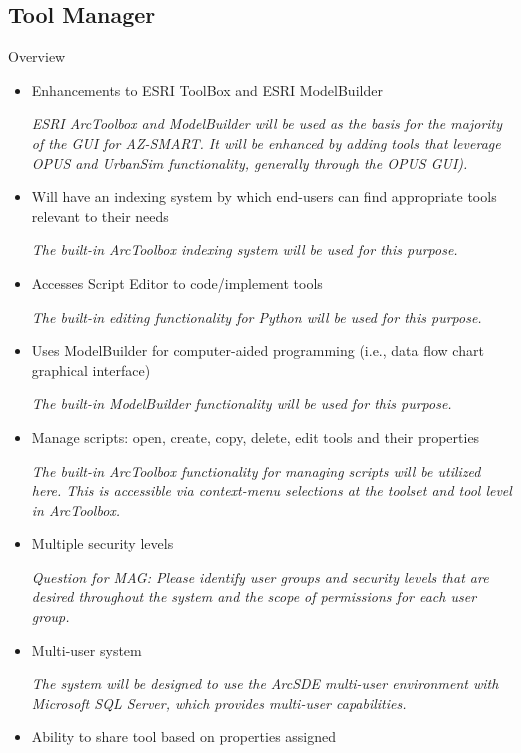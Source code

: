 \subsection{Tool Manager}
Overview
\begin{itemize}

\item Enhancements to ESRI ToolBox and ESRI ModelBuilder

\emph{ESRI ArcToolbox and ModelBuilder will be used as the basis for the majority of the GUI for AZ-SMART.  It will be enhanced by adding tools that leverage OPUS and UrbanSim functionality, generally through the OPUS GUI).}

\item Will have an indexing system by which end-users can find appropriate tools relevant to their needs

\emph{The built-in ArcToolbox indexing system will be used for this purpose.}

\item Accesses Script Editor to code/implement tools

\emph{The built-in editing functionality for Python will be used for this purpose.}

\item Uses ModelBuilder for computer-aided programming (i.e., data flow chart graphical interface)

\emph{The built-in ModelBuilder functionality will be used for this purpose.}

\item Manage scripts: open, create, copy, delete, edit tools and their properties

\emph{The built-in ArcToolbox functionality for managing scripts will be utilized here.  This is accessible via context-menu selections at the toolset and tool level in ArcToolbox.}

\item Multiple security levels

\emph{Question for MAG: Please identify user groups and security levels that are desired throughout the system and the scope of permissions for each user group.}

\item Multi-user system

\emph{The system will be designed to use the ArcSDE multi-user environment with Microsoft SQL Server, which provides multi-user capabilities.}

\item Ability to share tool based on properties assigned


\end{itemize}
